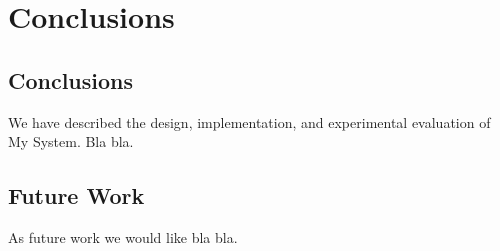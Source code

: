 \chapter{Conclusions}
\label{sec:conclusions}

\section{Conclusions}
We have described the design, implementation, and
experimental evaluation of  My System. Bla bla.

\section{Future Work}

As future work we would like bla bla.